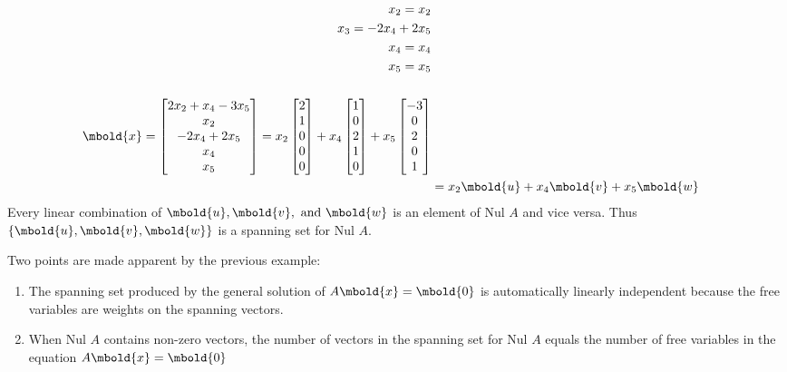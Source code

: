 \documentclass[12pt letter]{report}
\begin{document}
{{\begin{align*}
      x_2                    = x_2                            \\
      x_3                    = -2x_4 + 2x_5                   \\
      x_4                    = x_4                            \\
      x_5                    = x_5                            \\
      \\
      \mbold{x} = \begin{bmatrix} 2x_2 + x_4 - 3x_5 \\ x_2 \\ -2x_4 + 2x_5 \\ x_4 \\ x_5 \end{bmatrix} = x_2
      \begin{bmatrix} 2 \\ 1 \\ 0 \\ 0 \\ 0 \end{bmatrix} + x_4 \begin{bmatrix} 1 \\ 0 \\ 2 \\ 1 \\ 0 \end{bmatrix} +
      x_5 \begin{bmatrix} -3 \\ 0 \\ 2\\ 0 \\ 1 \end{bmatrix} \\
       & = x_2 \mbold{u} + x_4 \mbold{v} + x_5 \mbold{w}      \\
    \end{align*}
    Every linear combination of $\mbold{u}, \mbold{v}, \text{ and } \mbold{w}$ is an element of $\text{Nul } A$ and vice
    versa. Thus $\{\mbold{u}, \mbold{v}, \mbold{w}\} $ is a spanning set for $\text{Nul } A$.
  }
}

Two points are made apparent by the previous example:
\begin{enumerate}
  \item The spanning set produced by the general solution of $A\mbold{x} = \mbold{0}$ is automatically linearly
        independent because the free variables are weights on the spanning vectors.
  \item When $\text{Nul }A$ contains non-zero vectors, the number of vectors in the spanning set for $\text{Nul } A$
        equals the number of free variables in the equation $A\mbold{x} = \mbold{0}$
\end{enumerate}
\end{document}
